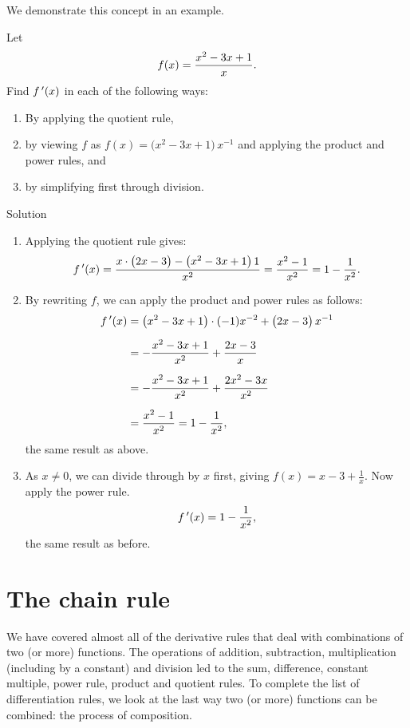 \ifvc 
We demonstrate this concept in an example.

\begin{example}\label{ex_multiple_deriv}
Let 
$$\displaystyle f(x) = \frac{x^2-3x+1}{x}.$$ Find $f\,'(x)$ in each of the following ways:
		\begin{enumerate}
		\item		By applying the quotient rule,
		\item		by viewing $f$ as $f(x) = \big(x^2-3x+1\big)\, x^{-1}$ and applying the product and power rules, and
		\item		by simplifying first through division.
		\end{enumerate}

Solution 

\begin{enumerate}
	\item		Applying the quotient rule gives: $$ f\,'(x) = \frac{x\cdot\big(2x-3\big)-\big(x^2-3x+1\big)\, 1}{x^2} = \frac{x^2-1}{x^2} = 1-\frac{1}{x^2}.$$
	\item		By rewriting $f$, we can apply the product and power rules as follows:
			\begin{align*}
			f\,'(x) &=		\big(x^2-3x+1\big)\cdot (-1)x^{-2} + \big(2x-3\big)\, x^{-1} \\[0.2cm]
							&=	-\frac{x^2-3x+1}{x^2}+\frac{2x-3}{x} \\[0.2cm]
							&= -\frac{x^2-3x+1}{x^2}+\frac{2x^2-3x}{x^2}\\[0.2cm]
							&= \frac{x^2-1}{x^2} = 1-\frac{1}{x^2},
			\end{align*}
			the same result as above.
	\item		As $x\neq 0$, we can divide through by $x$ first, giving $ f(x) = x-3+\frac{1}x$. Now apply the power rule. $$f\,'(x) = 1-\frac{1}{x^2},$$  the same result as before.
	\end{enumerate}
\end{example}
\fi

\section{The chain rule}\label{sec:chainrule}

We have covered almost all of the derivative rules that deal with combinations of two (or more) functions.  The operations of addition, subtraction, multiplication (including by a constant) and division led to the sum,  difference, constant multiple, power rule, product and quotient rules. To complete the list of differentiation rules, we look at the last way two (or more) functions can be combined: the process of composition.

